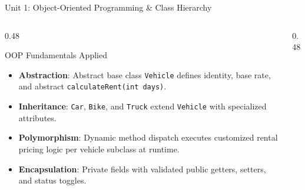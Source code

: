 \documentclass[aspectratio=169,10pt]{beamer}
\begin{document}
\begin{frame}{Unit 1: Object-Oriented Programming \& Class Hierarchy}
    \begin{columns}[T]
        \begin{column}{0.48\textwidth}
            \begin{block}{OOP Fundamentals Applied}
                \small
                \begin{itemize}
                    \item \textbf{Abstraction}: Abstract base class \texttt{Vehicle} defines identity, base rate, and abstract \texttt{calculateRent(int days)}.
                    \item \textbf{Inheritance}: \texttt{Car}, \texttt{Bike}, and \texttt{Truck} extend \texttt{Vehicle} with specialized attributes.
                    \item \textbf{Polymorphism}: Dynamic method dispatch executes customized rental pricing logic per vehicle subclass at runtime.
                    \item \textbf{Encapsulation}: Private fields with validated public getters, setters, and status toggles.
                \end{itemize}
            \end{block}
        \end{column}
        
        \begin{column}{0.48\textwidth}
            \centering
\end{column}
\end{columns}
\end{frame}
\end{document}
